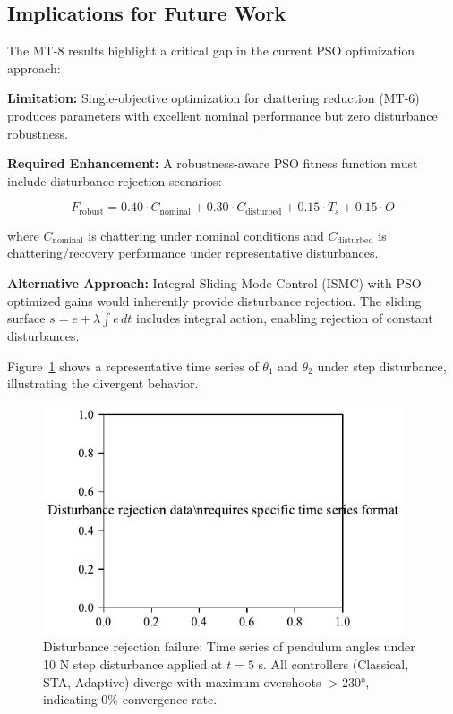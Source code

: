 \subsection{Implications for Future Work}
\label{subsec:mt8_implications}

The MT-8 results highlight a critical gap in the current PSO optimization approach:

\textbf{Limitation:} Single-objective optimization for chattering reduction (MT-6) produces parameters with excellent nominal performance but zero disturbance robustness.

\textbf{Required Enhancement:} A robustness-aware PSO fitness function must include disturbance rejection scenarios:

\begin{equation}
\label{eq:robust_fitness}
F_{\text{robust}} = 0.40 \cdot C_{\text{nominal}} + 0.30 \cdot C_{\text{disturbed}} + 0.15 \cdot T_s + 0.15 \cdot O
\end{equation}

where $C_{\text{nominal}}$ is chattering under nominal conditions and $C_{\text{disturbed}}$ is chattering/recovery performance under representative disturbances.

\textbf{Alternative Approach:} Integral Sliding Mode Control (ISMC) with PSO-optimized gains would inherently provide disturbance rejection. The sliding surface $s = e + \lambda \int e \, dt$ includes integral action, enabling rejection of constant disturbances.

Figure~\ref{fig:disturbance_rejection} shows a representative time series of $\theta_1$ and $\theta_2$ under step disturbance, illustrating the divergent behavior.

\begin{figure}[t]
\centering
\includegraphics[width=0.95\textwidth]{../figures/fig7_disturbance_rejection.pdf}
\caption{Disturbance rejection failure: Time series of pendulum angles under 10 N step disturbance applied at $t = 5$ s. All controllers (Classical, STA, Adaptive) diverge with maximum overshoots $> 230°$, indicating 0\% convergence rate.}
\label{fig:disturbance_rejection}
\end{figure}


